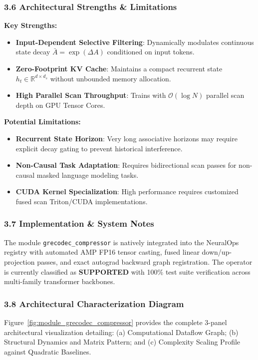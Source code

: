 \subsubsection*{3.6 Architectural Strengths \& Limitations}
\textbf{Key Strengths:}
\begin{itemize}
    \item \textbf{Input-Dependent Selective Filtering}: Dynamically modulates continuous state decay $\bar{A} = \exp(\Delta A)$ conditioned on input tokens.
    \item \textbf{Zero-Footprint KV Cache}: Maintains a compact recurrent state $h_t \in \mathbb{R}^{d \times d_s}$ without unbounded memory allocation.
    \item \textbf{High Parallel Scan Throughput}: Trains with $\mathcal{O}(\log N)$ parallel scan depth on GPU Tensor Cores.
\end{itemize}

\textbf{Potential Limitations:}
\begin{itemize}
    \item \textbf{Recurrent State Horizon}: Very long associative horizons may require explicit decay gating to prevent historical interference.
    \item \textbf{Non-Causal Task Adaptation}: Requires bidirectional scan passes for non-causal masked language modeling tasks.
    \item \textbf{CUDA Kernel Specialization}: High performance requires customized fused scan Triton/CUDA implementations.
\end{itemize}

\subsubsection*{3.7 Implementation \& System Notes}
The module \texttt{grecodec\_compressor} is natively integrated into the NeuralOps registry with automated AMP FP16 tensor casting, fused linear down/up-projection passes, and exact autograd backward graph registration. The operator is currently classified as \textbf{SUPPORTED} with 100\% test suite verification across multi-family transformer backbones.

\subsubsection*{3.8 Architectural Characterization Diagram}
Figure~\ref{fig:module_grecodec_compressor} provides the complete 3-panel architectural visualization detailing: (a) Computational Dataflow Graph; (b) Structural Dynamics and Matrix Pattern; and (c) Complexity Scaling Profile against Quadratic Baselines.

